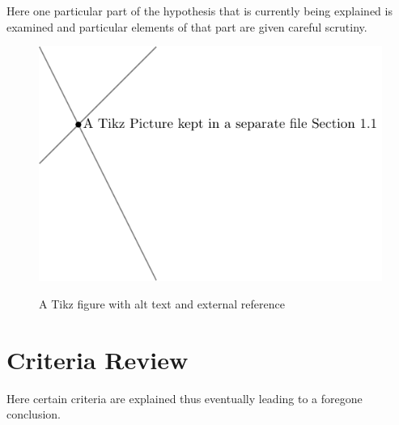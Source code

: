 Here one particular part of the hypothesis that is
currently being explained is examined and particular
elements of that part are given careful scrutiny.
\begin{figure}\centering
    \includegraphics[alt={two lines intersecting at a point}]{Images/tikzPic.pdf}
    \caption{A Tikz figure with alt text and external reference}
\end{figure}

\section{Criteria Review}

Here certain criteria are explained thus eventually
leading to a foregone conclusion.
